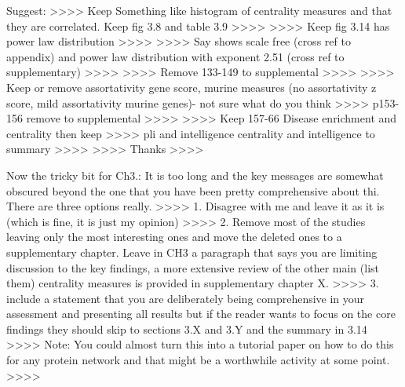  Suggest:
>>>> Keep Something like histogram of centrality measures and that they are correlated. Keep fig 3.8 and table 3.9
>>>>
>>>> Keep fig 3.14 has power law distribution
>>>>
>>>> Say shows scale free (cross ref to appendix) and power law distribution with exponent 2.51 (cross ref to supplementary)
>>>>
>>>> Remove 133-149 to supplemental
>>>>
>>>> Keep or remove assortativity gene score, murine measures  (no assortativity z score, mild assortativity murine genes)- not sure what do you think
>>>> p153- 156 remove to supplemental
>>>>
>>>> Keep 157-66 Disease enrichment and centrality then keep
>>>> pli and intelligence centrality and intelligence to summary
>>>>
>>>> Thanks
>>>>



 Now the tricky bit for Ch3.: It is too long and the key messages are somewhat obscured beyond the one that you have been pretty comprehensive about thi. There are three options really.
>>>> 1. Disagree with me and leave it as it is (which is fine, it is just my opinion)
>>>> 2. Remove most of the studies leaving only the most interesting ones and move the deleted ones to a supplementary chapter. Leave in CH3 a paragraph that says you are limiting discussion to the key findings, a more extensive review of the other main (list them) centrality measures is provided in supplementary chapter X.
>>>> 3. include a statement that you are deliberately being comprehensive in your assessment and presenting all results but if the reader wants to focus on the core findings they should skip to sections 3.X and 3.Y and the summary in 3.14
>>>> Note: You could almost turn this into a tutorial paper on how to do this for any protein network and that might be a worthwhile activity at some point.
>>>>